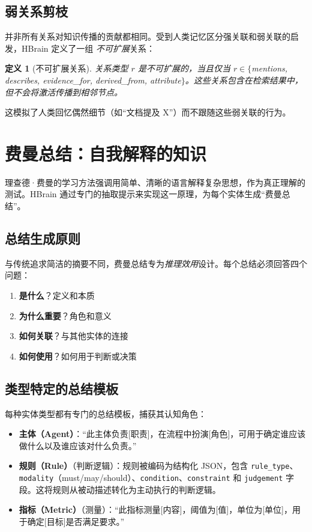 \documentclass[11pt]{article}
\newtheorem{definition}{定义}
\begin{document}
\subsection{弱关系剪枝}

并非所有关系对知识传播的贡献都相同。受到人类记忆区分强关联和弱关联的启发，HBrain 定义了一组 \textit{不可扩展}关系：

\begin{definition}[不可扩展关系]
关系类型 $r$ 是不可扩展的，当且仅当 $r \in \{$mentions, describes, evidence\_for, derived\_from, attribute$\}$。这些关系包含在检索结果中，但不会将激活传播到相邻节点。
\end{definition}

这模拟了人类回忆偶然细节（如“文档提及 X”）而不跟随这些弱关联的行为。

\section{费曼总结：自我解释的知识}
\label{sec:feynman}

理查德·费曼的学习方法强调用简单、清晰的语言解释复杂思想，作为真正理解的测试。HBrain 通过专门的抽取提示来实现这一原理，为每个实体生成“费曼总结”。

\subsection{总结生成原则}

与传统追求简洁的摘要不同，费曼总结专为\textit{推理效用}设计。每个总结必须回答四个问题：

\begin{enumerate}
    \item \textbf{是什么}？定义和本质
    \item \textbf{为什么重要}？角色和意义
    \item \textbf{如何关联}？与其他实体的连接
    \item \textbf{如何使用}？如何用于判断或决策
\end{enumerate}

\subsection{类型特定的总结模板}

每种实体类型都有专门的总结模板，捕获其认知角色：

\begin{itemize}
    \item \textbf{主体（Agent）}：“此主体负责[职责]，在流程中扮演[角色]，可用于确定谁应该做什么以及谁应该对什么负责。”
    \item \textbf{规则（Rule）}（判断逻辑）：规则被编码为结构化 JSON，包含 \texttt{rule\_type}、\texttt{modality}（must/may/should）、\texttt{condition}、\texttt{constraint} 和 \texttt{judgement} 字段。这将规则从被动描述转化为主动执行的判断逻辑。
    \item \textbf{指标（Metric）}（测量）：“此指标测量[内容]，阈值为[值]，单位为[单位]，用于确定[目标]是否满足要求。”
\end{itemize}
\end{document}
